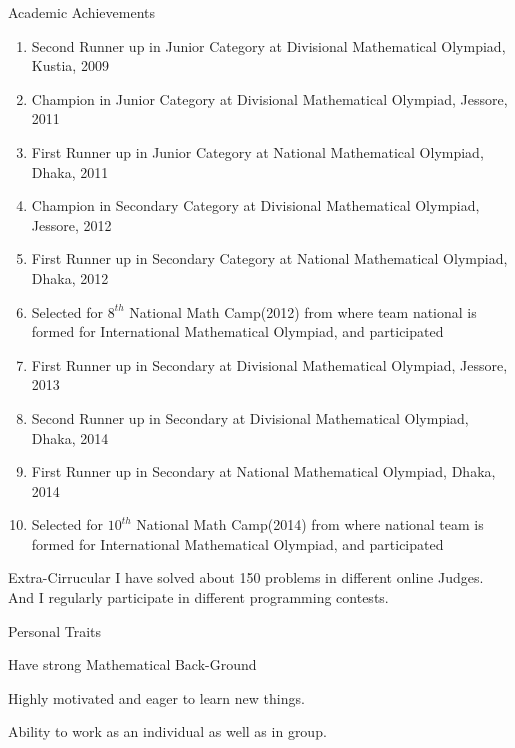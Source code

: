 \documentclass{resume} %
\begin{document}
\begin{rSection}{Academic Achievements} 
\begin{enumerate}
    \item {Second Runner up in Junior Category at Divisional Mathematical Olympiad, Kustia, 2009}
\item Champion in Junior Category at Divisional Mathematical Olympiad, Jessore, 2011
\item First Runner up in Junior Category at National Mathematical Olympiad, Dhaka, 2011
\item Champion in Secondary Category at Divisional Mathematical Olympiad, Jessore, 2012
\item First Runner up in Secondary Category at National Mathematical Olympiad, Dhaka, 2012
\item Selected for $8^{th}$ National Math Camp(2012) from where team national is formed for International Mathematical Olympiad, and participated
\item First Runner up in Secondary at Divisional Mathematical Olympiad, Jessore, 2013
\item Second Runner up in Secondary at Divisional Mathematical Olympiad, Dhaka, 2014
\item First Runner up in Secondary at National Mathematical Olympiad, Dhaka, 2014
\item Selected for $10^{th}$ National Math Camp(2014) from where national team is formed for International Mathematical Olympiad, and participated 
\end{enumerate}
\end{rSection}



\begin{rSection}{Extra-Cirrucular} \itemsep -3pt
 I have solved about 150 problems in different online Judges. And I regularly participate in different programming contests.

\end{rSection}

\begin{rSection}{Personal Traits}
\item Have strong Mathematical Back-Ground
\item Highly motivated and eager to learn new things.
\item Ability to work as an individual as well as in group.
\end{rSection}
\end{document}
